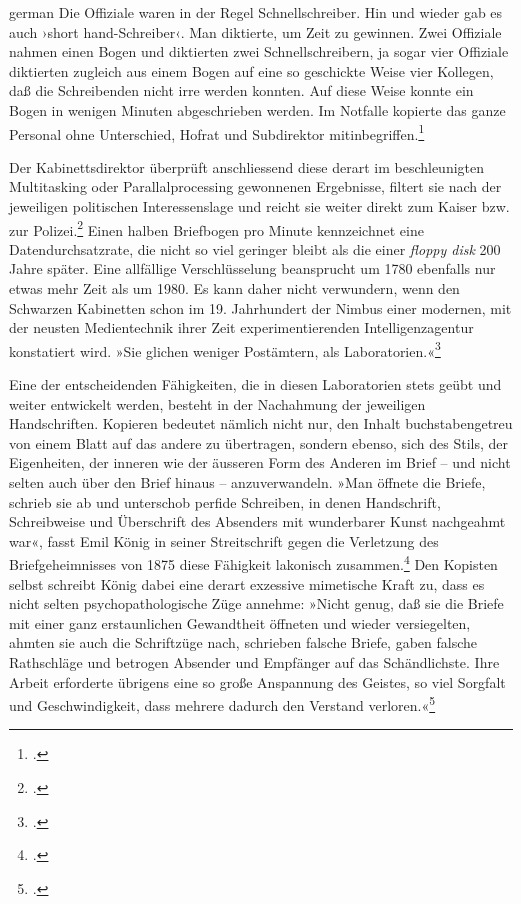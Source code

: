 \documentclass[a4paper,12pt]{article}
\newcommand{\anf}[1]{»#1«}
\newenvironment{zitat}{
\begin{spacing}{1}
\begin{foreigndisplayquote}{german}}%
{\end{foreigndisplayquote}\end{spacing}}
\begin{document}
\begin{zitat}
Die Offiziale waren in der Regel Schnellschreiber. Hin und wieder gab es auch ›short hand-Schreiber‹. Man diktierte, um Zeit zu gewinnen. Zwei Offiziale nahmen einen Bogen und diktierten zwei Schnellschreibern, ja sogar vier Offiziale diktierten zugleich aus einem Bogen auf eine so geschickte Weise vier Kollegen, daß die Schreibenden nicht irre werden konnten. Auf diese Weise konnte ein Bogen in wenigen Minuten abgeschrieben werden. Im Notfalle kopierte das ganze Personal ohne Unterschied, Hofrat und Subdirektor mitinbegriffen.\footcite[139]{stix:1937}
\end{zitat}
Der Kabinettsdirektor überprüft anschliessend diese derart im beschleunigten Multitasking oder Parallalprocessing gewonnenen Ergebnisse, filtert sie nach der jeweiligen politischen Interessenslage und reicht sie weiter direkt zum Kaiser bzw. zur Polizei.\footcite[140]{stix:1937} Einen halben Briefbogen pro Minute kennzeichnet eine Datendurchsatzrate, die nicht so viel geringer bleibt als die einer \emph{floppy disk} 200 Jahre später. Eine allfällige Verschlüsselung beansprucht um 1780 ebenfalls nur etwas mehr Zeit als um 1980. Es kann daher nicht verwundern, wenn den Schwarzen Kabinetten schon im 19. Jahrhundert der Nimbus einer modernen, mit der neusten Medientechnik ihrer Zeit experimentierenden Intelligenzagentur konstatiert wird. \anf{Sie glichen weniger Postämtern, als Laboratorien.}\footcite[40]{koenig:1875}

Eine der entscheidenden Fähigkeiten, die in diesen Laboratorien stets geübt und weiter entwickelt werden, besteht in der Nachahmung der jeweiligen Handschriften. Kopieren bedeutet nämlich nicht nur, den Inhalt buchstabengetreu von einem Blatt auf das andere zu übertragen, sondern ebenso, sich des Stils, der Eigenheiten, der inneren wie der äusseren Form des Anderen im Brief – und nicht selten auch über den Brief hinaus – anzuverwandeln. \anf{Man öffnete die Briefe, schrieb sie ab und unterschob perfide Schreiben, in denen Handschrift, Schreibweise und Überschrift des Absenders mit wunderbarer Kunst nachgeahmt war}, fasst Emil König in seiner Streitschrift gegen die Verletzung des Briefgeheimnisses von 1875 diese Fähigkeit lakonisch zusammen.\footcite[34]{koenig:1875} Den Kopisten selbst schreibt König dabei eine derart exzessive mimetische Kraft zu, dass es nicht selten psychopathologische Züge annehme: \anf{Nicht genug, daß sie die Briefe mit einer ganz erstaunlichen Gewandtheit öffneten und wieder versiegelten, ahmten sie auch die Schriftzüge nach, schrieben falsche Briefe, gaben falsche Rathschläge und betrogen Absender und Empfänger auf das Schändlichste. Ihre Arbeit erforderte übrigens eine so große Anspannung des Geistes, so viel Sorgfalt und Geschwindigkeit, dass mehrere dadurch den Verstand verloren.}\footcite[38]{koenig:1875} 
\end{document}
